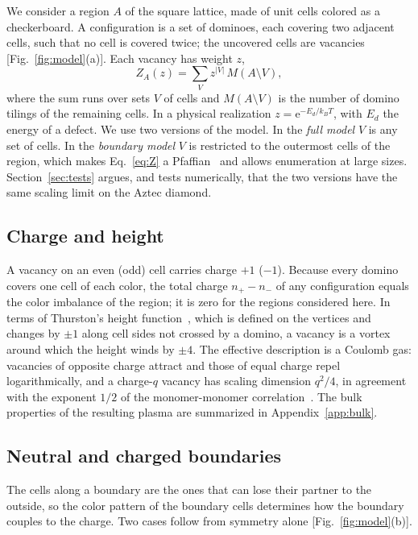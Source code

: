 \documentclass[reprint,aps,pre,superscriptaddress,longbibliography,floatfix,amsmath,amssymb]{revtex4-2}
\newcommand{\ee}{\mathrm{e}}
\begin{document}
We consider a region $A$ of the square lattice, made of unit cells colored as a checkerboard. A configuration is a set of dominoes, each covering two adjacent cells, such that no cell is covered twice; the uncovered cells are vacancies [Fig.~\ref{fig:model}(a)]. Each vacancy has weight $z$,
\begin{equation}\label{eq:Z}
  Z_A(z)=\sum_{V}z^{|V|}\,M(A\setminus V),
\end{equation}
where the sum runs over sets $V$ of cells and $M(A\setminus V)$ is the number of domino tilings of the remaining cells. In a physical realization $z=\ee^{-E_d/k_BT}$, with $E_d$ the energy of a defect. We use two versions of the model. In the \emph{full model} $V$ is any set of cells. In the \emph{boundary model} $V$ is restricted to the outermost cells of the region, which makes Eq.~\eqref{eq:Z} a Pfaffian~\cite{giuliani2016} and allows enumeration at large sizes. Section~\ref{sec:tests} argues, and tests numerically, that the two versions have the same scaling limit on the Aztec diamond.

\subsection{Charge and height}

A vacancy on an even (odd) cell carries charge $+1$ ($-1$). Because every domino covers one cell of each color, the total charge $n_+-n_-$ of any configuration equals the color imbalance of the region; it is zero for the regions considered here. In terms of Thurston's height function~\cite{TODO-thurston1990}, which is defined on the vertices and changes by $\pm1$ along cell sides not crossed by a domino, a vacancy is a vortex around which the height winds by $\pm4$. The effective description is a Coulomb gas: vacancies of opposite charge attract and those of equal charge repel logarithmically, and a charge-$q$ vacancy has scaling dimension $q^2/4$, in agreement with the exponent $1/2$ of the monomer-monomer correlation~\cite{TODO-fisher1963}. The bulk properties of the resulting plasma are summarized in Appendix~\ref{app:bulk}.

\subsection{Neutral and charged boundaries}

The cells along a boundary are the ones that can lose their partner to the outside, so the color pattern of the boundary cells determines how the boundary couples to the charge. Two cases follow from symmetry alone [Fig.~\ref{fig:model}(b)].
\end{document}
